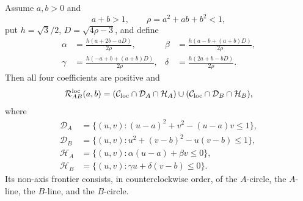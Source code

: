 \begin{theorem}
\label{thm:strict-ab-union}
Assume $a,b>0$ and
\[
 a+b>1,\qquad \rho=a^2+ab+b^2<1,
\]
put $h=\sqrt3/2$, $D=\sqrt{4\rho-3}$, and define
\begin{align*}
 \alpha&=\frac{h(a+2b-aD)}{2\rho},&
 \beta&=\frac{h(a-b+(a+b)D)}{2\rho},\\
 \gamma&=\frac{h(-a+b+(a+b)D)}{2\rho},&
 \delta&=\frac{h(2a+b-bD)}{2\rho}.
\end{align*}
Then all four coefficients are positive and
\begin{equation}
 \mathcal R_{AB}^{\rm loc}(a,b)=
 (\mathcal C_{\rm loc}\cap\mathcal D_A\cap\mathcal H_A)
 \cup(\mathcal C_{\rm loc}\cap\mathcal D_B\cap\mathcal H_B),       \label{eq:strict-ab-identity}
\end{equation}
where
\begin{align*}
 \mathcal D_A&=\{(u,v):(u-a)^2+v^2-(u-a)v\le1\},\\
 \mathcal D_B&=\{(u,v):u^2+(v-b)^2-u(v-b)\le1\},\\
 \mathcal H_A&=\{(u,v):\alpha(u-a)+\beta v\le0\},\\
 \mathcal H_B&=\{(u,v):\gamma u+\delta(v-b)\le0\}.
\end{align*}
Its non-axis frontier consists, in counterclockwise order, of the
$A$-circle, the $A$-line, the $B$-line, and the $B$-circle.
\end{theorem}



